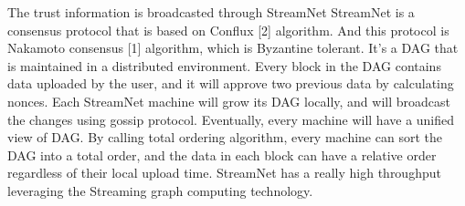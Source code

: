 The trust information is broadcasted through StreamNet
StreamNet is a consensus protocol that is based on Conflux [2] algorithm. And this protocol is Nakamoto consensus [1] algorithm, which is Byzantine tolerant.
It's a DAG that is maintained in a distributed environment. Every block in the DAG contains data uploaded by the user, and it will approve two previous data by calculating nonces.
Each StreamNet machine will grow its DAG locally, and will broadcast the changes using gossip protocol. Eventually, every machine will have a unified view of DAG.
By calling total ordering algorithm, every machine can sort the DAG into a total order, and the data in each block can have a relative order regardless of their local upload time. 
StreamNet has a really high throughput leveraging the Streaming graph computing technology.


